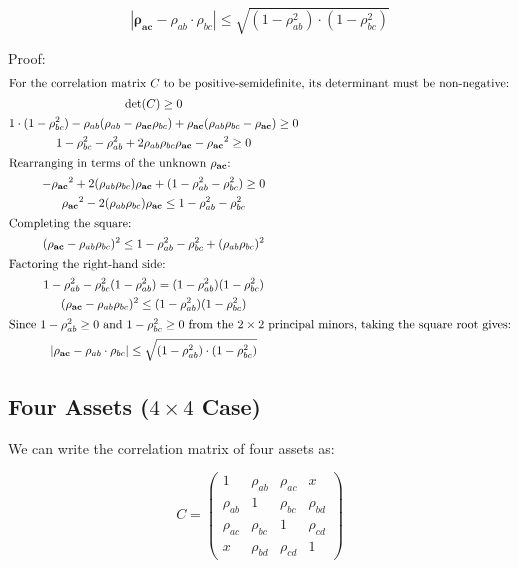 \documentclass[a4paper]{article}
\begin{document}
\begin{theorem} \label{spd:three} 
\begin{equation}
\boxed{
|\mathbf{\rho_{ac}} - \rho_{ab} \cdot \rho_{bc}| \leq \sqrt{(1 - \rho_{ab}^2) \cdot (1 - \rho_{bc}^2)}
}
\end{equation}

Proof:
\begin{gather*}
\shortintertext{For the correlation matrix $C$ to be positive-semidefinite, its determinant must be non-negative:}
\det(C) \geq 0
\\
1 \cdot (1 - \rho_{bc}^2) - \rho_{ab} (\rho_{ab} - \mathbf{\rho_{ac}} \rho_{bc}) + \mathbf{\rho_{ac}} (\rho_{ab} \rho_{bc} - \mathbf{\rho_{ac}}) \geq 0
\\
1 - \rho_{bc}^2 - \rho_{ab}^2 + 2 \rho_{ab} \rho_{bc} \mathbf{\rho_{ac}} - \mathbf{\rho_{ac}}^2 \geq 0
\\
\shortintertext{Rearranging in terms of the unknown $\mathbf{\rho_{ac}}$:}
-\mathbf{\rho_{ac}}^2 + 2(\rho_{ab} \rho_{bc}) \mathbf{\rho_{ac}} + (1 - \rho_{ab}^2 - \rho_{bc}^2) \geq 0
\\
\mathbf{\rho_{ac}}^2 - 2(\rho_{ab} \rho_{bc}) \mathbf{\rho_{ac}} \leq 1 - \rho_{ab}^2 - \rho_{bc}^2
\\
\shortintertext{Completing the square:}
(\mathbf{\rho_{ac}} - \rho_{ab} \rho_{bc})^2 \leq 1 - \rho_{ab}^2 - \rho_{bc}^2 + (\rho_{ab} \rho_{bc})^2
\\
\shortintertext{Factoring the right-hand side:}
1 - \rho_{ab}^2 - \rho_{bc}^2 (1 - \rho_{ab}^2) = (1 - \rho_{ab}^2)(1 - \rho_{bc}^2)
\\
(\mathbf{\rho_{ac}} - \rho_{ab} \rho_{bc})^2 \leq (1 - \rho_{ab}^2)(1 - \rho_{bc}^2)
\\
\shortintertext{Since $1 - \rho_{ab}^2 \geq 0$ and $1 - \rho_{bc}^2 \geq 0$ from the $2 \times 2$ principal minors, taking the square root gives:}
|\mathbf{\rho_{ac}} - \rho_{ab} \cdot \rho_{bc}| \leq \sqrt{(1 - \rho_{ab}^2) \cdot (1 - \rho_{bc}^2)}
\end{gather*}
\end{theorem}

\subsection{Four Assets (\texorpdfstring{$4 \times 4$}{4x4} Case)}
We can write the correlation matrix of four assets as:  

\begin{equation}
C = \begin{pmatrix}
1 & \rho_{ab} & \rho_{ac} & x \\
\rho_{ab} & 1 & \rho_{bc} & \rho_{bd} \\
\rho_{ac} & \rho_{bc} & 1 & \rho_{cd} \\
x & \rho_{bd} & \rho_{cd} & 1
\end{pmatrix}
\end{equation}
\end{document}
